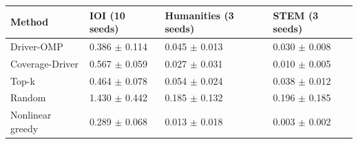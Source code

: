 \begin{tabular}{llll}
\toprule
Method & IOI (10 seeds) & Humanities (3 seeds) & STEM (3 seeds) \\
\midrule
Driver-OMP & 0.386 $\pm$ 0.114 & 0.045 $\pm$ 0.013 & 0.030 $\pm$ 0.008 \\
Coverage-Driver & 0.567 $\pm$ 0.059 & 0.027 $\pm$ 0.031 & 0.010 $\pm$ 0.005 \\
Top-k & 0.464 $\pm$ 0.078 & 0.054 $\pm$ 0.024 & 0.038 $\pm$ 0.012 \\
Random & 1.430 $\pm$ 0.442 & 0.185 $\pm$ 0.132 & 0.196 $\pm$ 0.185 \\
Nonlinear greedy & 0.289 $\pm$ 0.068 & 0.013 $\pm$ 0.018 & 0.003 $\pm$ 0.002 \\
\bottomrule
\end{tabular}
